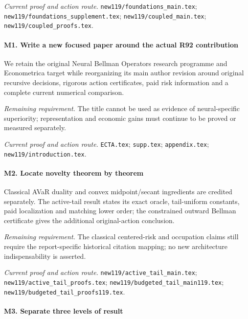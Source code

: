 \par\emph{Current proof and action route.} \nolinkurl{new119/foundations_main.tex}; \nolinkurl{new119/foundations_supplement.tex}; \nolinkurl{new119/coupled_main.tex}; \nolinkurl{new119/coupled_proofs.tex}.

\paragraph{M1. Write a new focused paper around the actual R92 contribution}

We retain the original Neural Bellman Operators research programme and Econometrica target while reorganizing its main author revision around original recursive decisions, rigorous action certificates, paid risk information and a complete current numerical comparison.

\par\emph{Remaining requirement.} The title cannot be used as evidence of neural-specific superiority; representation and economic gains must continue to be proved or measured separately.

\par\emph{Current proof and action route.} \nolinkurl{ECTA.tex}; \nolinkurl{supp.tex}; \nolinkurl{appendix.tex}; \nolinkurl{new119/introduction.tex}.

\paragraph{M2. Locate novelty theorem by theorem}

Classical AVaR duality and convex midpoint/\allowbreak{}secant ingredients are credited separately. The active-tail result states its exact oracle, tail-uniform constants, paid localization and matching lower order; the constrained outward Bellman certificate gives the additional original-action conclusion.

\par\emph{Remaining requirement.} The classical centered-risk and occupation claims still require the report-specific historical citation mapping; no new architecture indispensability is asserted.

\par\emph{Current proof and action route.} \nolinkurl{new119/active_tail_main.tex}; \nolinkurl{new119/active_tail_proofs.tex}; \nolinkurl{new119/budgeted_tail_main119.tex}; \nolinkurl{new119/budgeted_tail_proofs119.tex}.

\paragraph{M3. Separate three levels of result}


